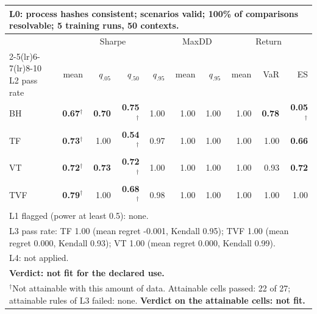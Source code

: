 \begin{tabular}{lrrrrrrrrr}
\toprule
\multicolumn{10}{p{13.5cm}}{L0: process hashes consistent; scenarios valid; 100\% of comparisons resolvable; 5 training runs, 50 contexts.} \\
\midrule
 & \multicolumn{4}{c}{Sharpe} & \multicolumn{2}{c}{MaxDD} & \multicolumn{3}{c}{Return} \\
\cmidrule(lr){2-5}\cmidrule(lr){6-7}\cmidrule(lr){8-10}
L2 pass rate & mean & $q_{.05}$ & $q_{.50}$ & $q_{.95}$ & mean & $q_{.95}$ & mean & VaR & ES \\
\midrule
BH & \textbf{0.67}$^{\dagger}$ & \textbf{0.70} & \textbf{0.75}$^{\dagger}$ & 1.00 & 1.00 & 1.00 & 1.00 & \textbf{0.78} & \textbf{0.05}$^{\dagger}$ \\
TF & \textbf{0.73}$^{\dagger}$ & 1.00 & \textbf{0.54}$^{\dagger}$ & 0.97 & 1.00 & 1.00 & 1.00 & 1.00 & \textbf{0.66} \\
VT & \textbf{0.72}$^{\dagger}$ & \textbf{0.73} & \textbf{0.72}$^{\dagger}$ & 1.00 & 1.00 & 1.00 & 1.00 & 0.93 & \textbf{0.72} \\
TVF & \textbf{0.79}$^{\dagger}$ & 1.00 & \textbf{0.68}$^{\dagger}$ & 0.98 & 1.00 & 1.00 & 1.00 & 1.00 & 1.00 \\
\midrule
\multicolumn{10}{p{13.5cm}}{L1 flagged (power at least 0.5): none.} \\
\multicolumn{10}{p{13.5cm}}{L3 pass rate: TF 1.00 (mean regret -0.001, Kendall 0.95); TVF 1.00 (mean regret 0.000, Kendall 0.93); VT 1.00 (mean regret 0.000, Kendall 0.99).} \\
\multicolumn{10}{p{13.5cm}}{L4: not applied.} \\
\multicolumn{10}{p{13.5cm}}{\textbf{Verdict: not fit for the declared use.}} \\
\multicolumn{10}{p{13.5cm}}{$^{\dagger}$Not attainable with this amount of data. Attainable cells passed: 22 of 27; attainable rules of L3 failed: none. \textbf{Verdict on the attainable cells: not fit.}} \\
\bottomrule
\end{tabular}
